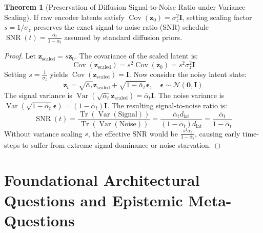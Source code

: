 \documentclass[11pt,a4paper]{article}
\theoremstyle{definition}
\newtheorem{theorem}{\textbf{Theorem}}[section]
\begin{document}
\begin{theorem}[Preservation of Diffusion Signal-to-Noise Ratio under Variance Scaling]
If raw encoder latents satisfy $\operatorname{Cov}(\mathbf{z}_0) = \sigma_z^2 \mathbf{I}$, setting scaling factor $s = 1/\sigma_z$ preserves the exact signal-to-noise ratio (SNR) schedule $\operatorname{SNR}(t) = \frac{\bar{\alpha}_t}{1 - \bar{\alpha}_t}$ assumed by standard diffusion priors.
\end{theorem}

\begin{proof}
Let $\mathbf{z}_{\text{scaled}} = s \mathbf{z}_0$. The covariance of the scaled latent is:
{\boldmath
\begin{equation}
\operatorname{Cov}(\mathbf{z}_{\text{scaled}}) = s^2 \operatorname{Cov}(\mathbf{z}_0) = s^2 \sigma_z^2 \mathbf{I}
\end{equation}
}
Setting $s = \frac{1}{\sigma_z}$ yields $\operatorname{Cov}(\mathbf{z}_{\text{scaled}}) = \mathbf{I}$.
Now consider the noisy latent state:
{\boldmath
\begin{equation}
\mathbf{z}_t = \sqrt{\bar{\alpha}_t}\mathbf{z}_{\text{scaled}} + \sqrt{1 - \bar{\alpha}_t}\boldsymbol{\epsilon}, \quad \boldsymbol{\epsilon} \sim \mathcal{N}(\mathbf{0}, \mathbf{I})
\end{equation}
}
The signal variance is $\operatorname{Var}(\sqrt{\bar{\alpha}_t}\mathbf{z}_{\text{scaled}}) = \bar{\alpha}_t \mathbf{I}$.
The noise variance is $\operatorname{Var}(\sqrt{1 - \bar{\alpha}_t}\boldsymbol{\epsilon}) = (1 - \bar{\alpha}_t)\mathbf{I}$.
The resulting signal-to-noise ratio is:
{\boldmath
\begin{equation}
\operatorname{SNR}(t) = \frac{\operatorname{Tr}(\operatorname{Var}(\text{Signal}))}{\operatorname{Tr}(\operatorname{Var}(\text{Noise}))} = \frac{\bar{\alpha}_t d_{\text{lat}}}{(1 - \bar{\alpha}_t) d_{\text{lat}}} = \frac{\bar{\alpha}_t}{1 - \bar{\alpha}_t}
\end{equation}
}
Without variance scaling $s$, the effective SNR would be $\frac{s^2 \bar{\alpha}_t}{1 - \bar{\alpha}_t}$, causing early time-steps to suffer from extreme signal dominance or noise starvation.
\end{proof}

\section{Foundational Architectural Questions and Epistemic Meta-Questions}
\end{document}

